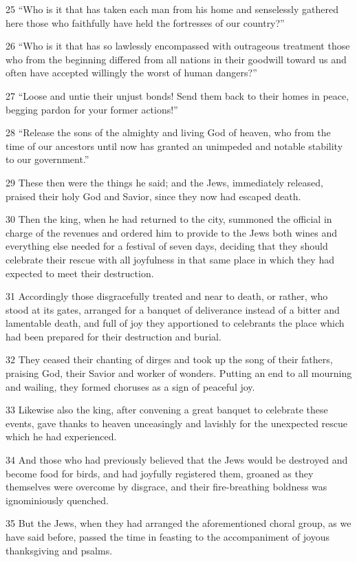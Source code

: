 \par 25 “Who is it that has taken each man from his home and senselessly gathered here those who faithfully have held the fortresses of our country?”
\par 26 “Who is it that has so lawlessly encompassed with outrageous treatment those who from the beginning differed from all nations in their goodwill toward us and often have accepted willingly the worst of human dangers?”
\par 27 “Loose and untie their unjust bonds! Send them back to their homes in peace, begging pardon for your former actions!”
\par 28 “Release the sons of the almighty and living God of heaven, who from the time of our ancestors until now has granted an unimpeded and notable stability to our government.”
\par 29 These then were the things he said; and the Jews, immediately released, praised their holy God and Savior, since they now had escaped death.
\par 30 Then the king, when he had returned to the city, summoned the official in charge of the revenues and ordered him to provide to the Jews both wines and everything else needed for a festival of seven days, deciding that they should celebrate their rescue with all joyfulness in that same place in which they had expected to meet their destruction.
\par 31 Accordingly those disgracefully treated and near to death, or rather, who stood at its gates, arranged for a banquet of deliverance instead of a bitter and lamentable death, and full of joy they apportioned to celebrants the place which had been prepared for their destruction and burial.
\par 32 They ceased their chanting of dirges and took up the song of their fathers, praising God, their Savior and worker of wonders. Putting an end to all mourning and wailing, they formed choruses as a sign of peaceful joy.
\par 33 Likewise also the king, after convening a great banquet to celebrate these events, gave thanks to heaven unceasingly and lavishly for the unexpected rescue which he had experienced.
\par 34 And those who had previously believed that the Jews would be destroyed and become food for birds, and had joyfully registered them, groaned as they themselves were overcome by disgrace, and their fire-breathing boldness was ignominiously quenched.
\par 35 But the Jews, when they had arranged the aforementioned choral group, as we have said before, passed the time in feasting to the accompaniment of joyous thanksgiving and psalms.
